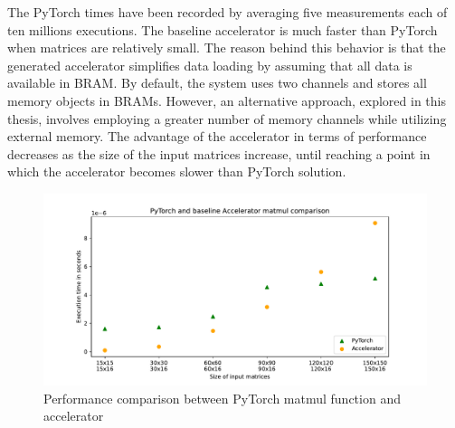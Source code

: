 The PyTorch times have been recorded by averaging five measurements each of ten millions executions.
The baseline accelerator is much faster than PyTorch when matrices are relatively small.
The reason behind this behavior is that the generated accelerator simplifies data loading by assuming that all data is available in BRAM. By default, the system uses two channels and stores all memory objects in BRAMs.
However, an alternative approach, explored in this thesis, involves employing a greater number of memory channels while utilizing external memory.
The advantage of the accelerator in terms of performance decreases as the size of the input matrices increase, until reaching a point in which the accelerator becomes slower than PyTorch solution.


\begin{figure}[t]
    \centering
    \includegraphics[height=0.4\textwidth]{Images/matmul_comparison}
    \caption{Performance comparison between PyTorch matmul function and accelerator}
    \label{fig:pytorch-accelerator-comparison}
\end{figure}

